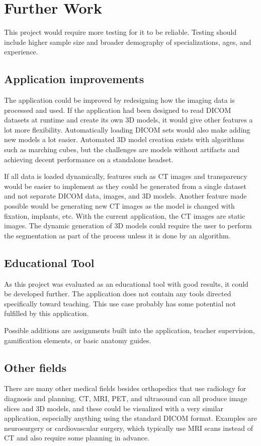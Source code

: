 \documentclass[a4paper]{report}
\begin{document}
\chapter{Further Work}
This project would require more testing for it to be reliable. Testing should include higher sample size and broader demography of specializations, ages, and experience.

\section{Application improvements}
The application could be improved by redesigning how the imaging data is processed and used. If the application had been designed to read DICOM datasets at runtime and create its own 3D models, it would give other features a lot more flexibility. Automatically loading DICOM sets would also make adding new models a lot easier. Automated 3D model creation exists with algorithms such as marching cubes, but the challenges are models without artifacts and achieving decent performance on a standalone headset.

If all data is loaded dynamically, features such as CT images and transparency would be easier to implement as they could be generated from a single dataset and not separate DICOM data, images, and 3D models. Another feature made possible would be generating new CT images as the model is changed with fixation, implants, etc. With the current application, the CT images are static images.
The dynamic generation of 3D models could require the user to perform the segmentation as part of the process unless it is done by an algorithm.

\section{Educational Tool}
As this project was evaluated as an educational tool with good results, it could be developed further. The application does not contain any tools directed specifically toward teaching. This use case probably has some potential not fulfilled by this application.

Possible additions are assignments built into the application, teacher supervision, gamification elements, or basic anatomy guides.

\section{Other fields}
There are many other medical fields besides orthopedics that use radiology for diagnosis and planning.
CT, MRI, PET, and ultrasound can all produce image slices and 3D models, and these could be visualized with a very similar application, especially anything using the standard DICOM format.
Examples are neurosurgery or cardiovascular surgery, which typically use MRI scans instead of CT and also require some planning in advance.
\end{document}
